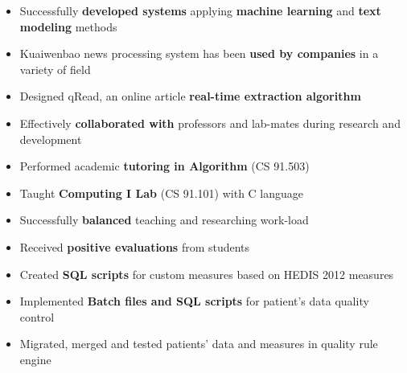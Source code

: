 \documentclass{resume}
\begin{document}
\begin{itemize}
    \item Successfully \textbf{developed systems} applying \textbf{machine learning} and \textbf{text modeling} methods
	\item Kuaiwenbao news processing system has been \textbf{used by companies} in a variety of field
	\item Designed qRead, an online article \textbf{real-time extraction algorithm}
    \item Effectively \textbf{collaborated with} professors and lab-mates during research and development
\end{itemize}

\begin{itemize}
  \item Performed academic \textbf{tutoring in Algorithm} (CS 91.503)
  \item Taught \textbf{Computing I Lab} (CS 91.101) with C language
  \item Successfully \textbf{balanced} teaching and researching work-load
  \item Received \textbf{positive evaluations} from students
\end{itemize}



\begin{itemize}
  \item Created \textbf{SQL scripts} for custom measures based on HEDIS 2012 measures
  \item Implemented \textbf{Batch files and SQL scripts} for patient’s data quality control
  \item Migrated, merged and tested patients’ data and measures in quality rule engine
\end{itemize}
\end{document}

